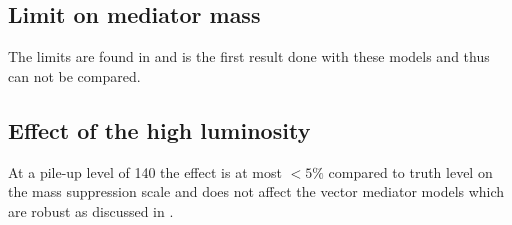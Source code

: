 \subsection{Limit on mediator mass}
The limits are found in  and is the first result done with these models and thus can not be compared.

\subsection{Effect of the high luminosity}
At a pile-up level of 140 the effect is at most $<5\%$ compared to truth level on the mass suppression scale and does not affect the vector mediator models which are robust as discussed in .